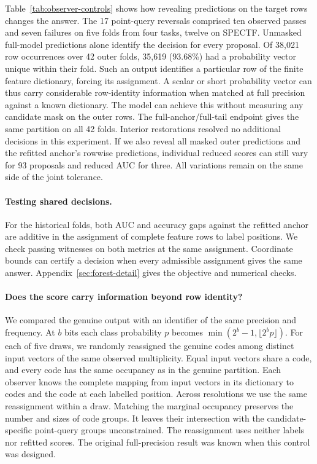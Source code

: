 Table~\ref{tab:observer-controls} shows how revealing predictions on the target rows changes the answer. The 17 point-query reversals comprised ten observed passes and seven failures on five folds from four tasks, twelve on SPECTF. Unmasked full-model predictions alone identify the decision for every proposal. Of 38,021 row occurrences over 42 outer folds, 35,619 (93.68\%) had a probability vector unique within their fold. Such an output identifies a particular row of the finite feature dictionary, forcing its assignment. A scalar or short probability vector can thus carry considerable row-identity information when matched at full precision against a known dictionary. The model can achieve this without measuring any candidate mask on the outer rows. The full-anchor/full-tail endpoint gives the same partition on all 42 folds. Interior restorations resolved no additional decisions in this experiment. If we also reveal all masked outer predictions and the refitted anchor's rowwise predictions, individual reduced scores can still vary for 93 proposals and reduced AUC for three. All variations remain on the same side of the joint tolerance.

\paragraph{Testing shared decisions.}
For the historical folds, both AUC and accuracy gaps against the refitted anchor are additive in the assignment of complete feature rows to label positions. We check passing witnesses on both metrics at the same assignment. Coordinate bounds can certify a decision when every admissible assignment gives the same answer. Appendix~\ref{sec:forest-detail} gives the objective and numerical checks.



\paragraph{Does the score carry information beyond row identity?}
We compared the genuine output with an identifier of the same precision and frequency. At $b$ bits each class probability $p$ becomes $\min(2^b-1,\lfloor 2^bp\rfloor)$. For each of five draws, we randomly reassigned the genuine codes among distinct input vectors of the same observed multiplicity. Equal input vectors share a code, and every code has the same occupancy as in the genuine partition. Each observer knows the complete mapping from input vectors in its dictionary to codes and the code at each labelled position. Across resolutions we use the same reassignment within a draw. Matching the marginal occupancy preserves the number and sizes of code groups. It leaves their intersection with the candidate-specific point-query groups unconstrained. The reassignment uses neither labels nor refitted scores. The original full-precision result was known when this control was designed.

